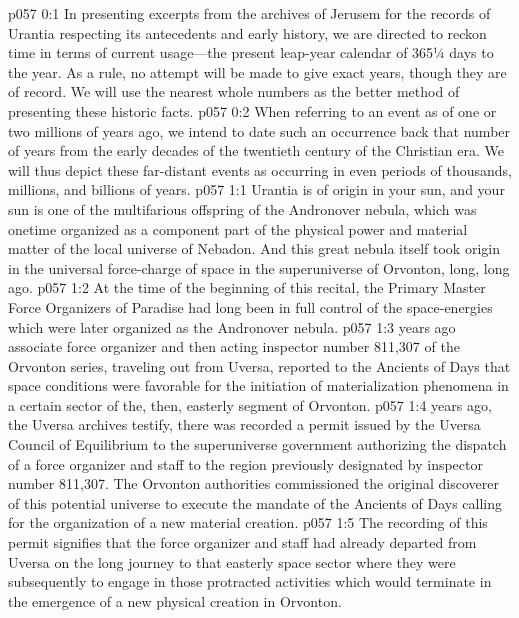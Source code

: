\author{Life Carrier}
\vs p057 0:1 In presenting excerpts from the archives of Jerusem for the records of Urantia respecting its antecedents and early history, we are directed to reckon time in terms of current usage---the present leap\hyp{}year calendar of 365¼ days to the year. As a rule, no attempt will be made to give exact years, though they are of record. We will use the nearest whole numbers as the better method of presenting these historic facts.
\vs p057 0:2 When referring to an event as of one or two millions of years ago, we intend to date such an occurrence back that number of years from the early decades of the twentieth century of the Christian era. We will thus depict these far\hyp{}distant events as occurring in even periods of thousands, millions, and billions of years.
\vs p057 1:1 Urantia is of origin in your sun, and your sun is one of the multifarious offspring of the Andronover nebula, which was onetime organized as a component part of the physical power and material matter of the local universe of Nebadon. And this great nebula itself took origin in the universal force\hyp{}charge of space in the superuniverse of Orvonton, long, long ago.
\vs p057 1:2 At the time of the beginning of this recital, the Primary Master Force Organizers of Paradise had long been in full control of the space\hyp{}energies which were later organized as the Andronover nebula.
\pc \vs p057 1:3  years ago associate force organizer and then acting inspector number 811,307 of the Orvonton series, traveling out from Uversa, reported to the Ancients of Days that space conditions were favorable for the initiation of materialization phenomena in a certain sector of the, then, easterly segment of Orvonton.
\pc \vs p057 1:4  years ago, the Uversa archives testify, there was recorded a permit issued by the Uversa Council of Equilibrium to the superuniverse government authorizing the dispatch of a force organizer and staff to the region previously designated by inspector number 811,307. The Orvonton authorities commissioned the original discoverer of this potential universe to execute the mandate of the Ancients of Days calling for the organization of a new material creation.
\vs p057 1:5 The recording of this permit signifies that the force organizer and staff had already departed from Uversa on the long journey to that easterly space sector where they were subsequently to engage in those protracted activities which would terminate in the emergence of a new physical creation in Orvonton.
